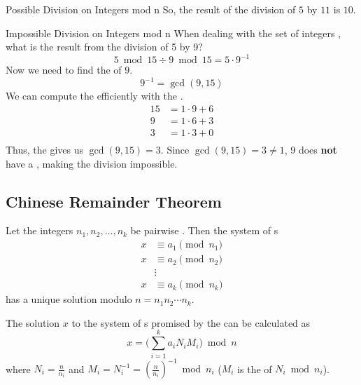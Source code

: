 \begin{example}[]{Possible Division on Integers mod n}
  So, the result of the division of $5$ by $11$ is $10$.
\end{example}

\begin{example}[]{Impossible Division on Integers mod n}
  When dealing with the set of integers , what is the result from the division of 5 by 9?
  \tcblower{}
  \begin{equation*}
    5 \bmod 15 \div 9 \bmod 15 = 5 \cdot 9^{-1}
  \end{equation*}
  Now we need to find the  of $9$.
  \begin{equation*}
    9^{-1} = \gcd(9, 15)
  \end{equation*}
  We can compute the  efficiently with the .
  \begin{align*}
    15 &= 1 \cdot 9 + 6 \\
    9 &= 1 \cdot 6 + 3 \\
    3 &= 1 \cdot 3 + 0 \\
  \end{align*}
  Thus, the  gives us $\gcd(9, 15) = 3$.
  Since $\gcd(9, 15) = 3 \neq 1$, 9 does \textbf{not} have a , making the division impossible.
\end{example}

\subsection{Chinese Remainder Theorem}\label{subsec:Chinese_Remainder_Theorem}
\begin{theorem}\label{thm:Chinese_Remainder_Theorem}
  Let the integers $n_{1}, n_{2}, \ldots, n_{k}$ be pairwise .
  Then the system of s
  \begin{align*}
    x &\equiv a_{1} \pmod{n_{1}} \\
    x &\equiv a_{2} \pmod{n_{2}} \\
      &\vdots \\
    x &\equiv a_{k} \pmod{n_{k}}
  \end{align*}
  has a unique solution modulo $n = n_{1}n_{2} \cdots n_{k}$.
\end{theorem}

\begin{definition}\label{def:Gauss_Algorithm}
  The solution $x$ to the system of s promised by the  can be calculated as
  \begin{equation}\label{eq:Gauss_Algorithm}
    x = \Biggl( \sum\limits_{i=1}^{k}a_{i} N_{i} M_{i} \Biggr) \bmod n
  \end{equation}
  where $N_{i} = \frac{n}{n_{i}}$ and $M_{i} = N_{i}^{-1} = {\left( \frac{n}{n_{i}} \right)}^{-1} \bmod n_{i}$ ($M_{i}$ is the  of $N_{i} \bmod n_{i}$).
\end{definition}

